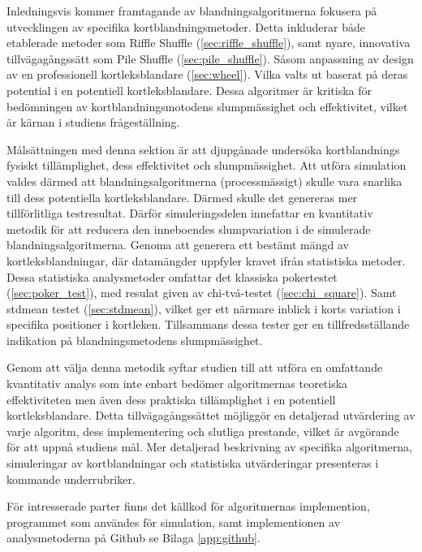\documentclass[swedish,a4paper]{article}
\begin{document}
Inledningsvis kommer framtagande av blandningsalgoritmerna fokusera på
utvecklingen av specifika kortblandningsmetoder. Detta inkluderar både
etablerade metoder som Riffle Shuffle (\ref{sec:riffle_shuffle}), samt nyare,
innovativa tillvägagångssätt som Pile Shuffle (\ref{sec:pile_shuffle}). Såsom
anpassning av design av en professionell kortleksblandare (\ref{sec:wheel}).
Vilka valts ut baserat på deras potential i en potentiell kortleksblandare.
Dessa algoritmer är kritiska för bedömningen av kortblandningsmotodens
slumpmässighet och effektivitet, vilket är kärnan i studiens frågeställning. 

Målsättningen med denna sektion är att djupgånade undersöka kortblandnings
fysiskt tillämplighet, dess effektivitet och slumpmässighet. Att utföra 
simulation valdes därmed att blandningsalgoritmerna
(processmässigt) skulle vara snarlika till dess potentiella kortleks\-blandare.
Därmed skulle det genereras mer tillförlitliga testresultat. Därför simuleringsdelen
innefattar en kvantitativ metodik för att reducera den inneboendes
slumpvariation i de simulerade blandningsalgoritmerna. Genoma att generera ett bestämt
mängd av kortleksblandningar, där datamängder uppfyler kravet ifrån statistiska metoder. Dessa
statistiska  analysmetoder omfattar det klassiska pokertestet (\ref{sec:poker_test}), med
resulat given av chi-två-testet (\ref{sec:chi_square}). Samt \gls{stdmean} testet
(\ref{sec:stdmean}), vilket ger ett närmare inblick i korts variation i specifika
positioner i kortleken. Tillsammans dessa tester ger en tillfredsställande indikation på
blandningsmetodens slumpmässighet. 

Genom att välja denna metodik syftar studien till att utföra en omfattande
kvantitativ analys som inte enbart bedömer algoritmernas teoretiska
effektiviteten men även dess praktiska tillämplighet i en potentiell kortleks\-blandare.
Detta tillvägagångssättet möjliggör en detaljerad utvärdering av varje algoritm,
dess implementering och slutliga prestande, vilket är avgörande för att uppnå
studiens mål. Mer detaljerad beskrivning av specifika algoritmerna,
simuleringar av kortblandningar och statistiska utvärderingar presenteras i kommande 
underrubriker. 

För intresserade parter finns det källkod för algoritmernas implemention,
programmet som användes för simulation, samt implementionen av analysmetoderna
på Github se Bilaga \ref{app:github}.
\end{document}
